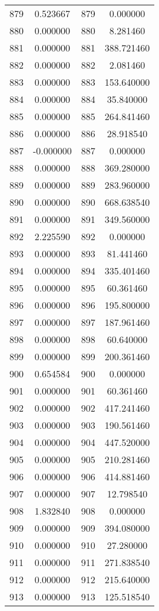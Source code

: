 \documentclass[12pt]{article}
\begin{document}
\begin{longtable}{@{}cccc@{}}
879 & 0.523667 & 879 & 0.000000 \\
880 & 0.000000 & 880 & 8.281460 \\
881 & 0.000000 & 881 & 388.721460 \\
882 & 0.000000 & 882 & 2.081460 \\
883 & 0.000000 & 883 & 153.640000 \\
884 & 0.000000 & 884 & 35.840000 \\
885 & 0.000000 & 885 & 264.841460 \\
886 & 0.000000 & 886 & 28.918540 \\
887 & -0.000000 & 887 & 0.000000 \\
888 & 0.000000 & 888 & 369.280000 \\
889 & 0.000000 & 889 & 283.960000 \\
890 & 0.000000 & 890 & 668.638540 \\
891 & 0.000000 & 891 & 349.560000 \\
892 & 2.225590 & 892 & 0.000000 \\
893 & 0.000000 & 893 & 81.441460 \\
894 & 0.000000 & 894 & 335.401460 \\
895 & 0.000000 & 895 & 60.361460 \\
896 & 0.000000 & 896 & 195.800000 \\
897 & 0.000000 & 897 & 187.961460 \\
898 & 0.000000 & 898 & 60.640000 \\
899 & 0.000000 & 899 & 200.361460 \\
900 & 0.654584 & 900 & 0.000000 \\
901 & 0.000000 & 901 & 60.361460 \\
902 & 0.000000 & 902 & 417.241460 \\
903 & 0.000000 & 903 & 190.561460 \\
904 & 0.000000 & 904 & 447.520000 \\
905 & 0.000000 & 905 & 210.281460 \\
906 & 0.000000 & 906 & 414.881460 \\
907 & 0.000000 & 907 & 12.798540 \\
908 & 1.832840 & 908 & 0.000000 \\
909 & 0.000000 & 909 & 394.080000 \\
910 & 0.000000 & 910 & 27.280000 \\
911 & 0.000000 & 911 & 271.838540 \\
912 & 0.000000 & 912 & 215.640000 \\
913 & 0.000000 & 913 & 125.518540 \\

\end{longtable}
\end{document}
